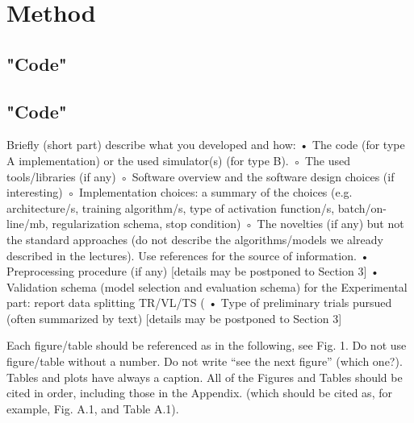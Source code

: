 \section{Method}
\subsection{"Code"}
\subsection{"Code"}











Briefly (short part) describe what you developed and how:
• The code (for type A implementation) or the used simulator(s) (for type B). 
◦ The used tools/libraries (if any)
◦ Software overview and the software design choices (if interesting)
◦ Implementation choices: a  summary of the choices (e.g. architecture/s, training algorithm/s, type of activation function/s, batch/on-line/mb, regularization schema, stop condition)
◦ The novelties (if any) but not the standard approaches (do not describe the algorithms/models we already described in the lectures). Use references for the source of information. 
• Preprocessing procedure (if any) [details may be postponed to Section 3]
• Validation schema (model selection and evaluation schema) for the Experimental part: report data splitting  TR/VL/TS (%
• Type of preliminary trials pursued (often summarized by text) [details may be postponed to Section 3]



Each figure/table should be referenced as in the following, see Fig. 1. 
Do not use figure/table without a number. Do not write “see the next figure” (which one?).
Tables and plots have always a caption. All of the Figures and Tables should be cited in order, including those in the Appendix. (which should be cited as, for example, Fig. A.1, and Table A.1).